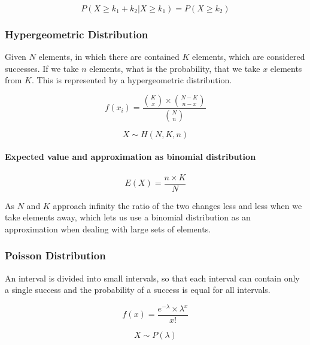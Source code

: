 \documentclass[12pt]{article}
\begin{document}
	\begin{equation*}
		P(X\geq k_1+k_2 | X\geq k_1) = P(X\geq k_2)
	\end{equation*}
	
	\subsubsection{Hypergeometric Distribution}
	
	Given \(N\) elements, in which there are contained \(K\) elements, which are considered successes. If we take \(n\) elements, what is the probability, that we take \(x\) elements from \(K\).
	This is represented by a hypergeometric distribution.
	
	\begin{equation*}
		f(x_i)=\frac{\binom{K}{x}\times \binom{N-K}{n-x}}{\binom{N}{n}}
	\end{equation*}
	
	\begin{equation*}
		X\sim H(N, K, n)
	\end{equation*}
	
	\paragraph{Expected value and approximation as binomial distribution}
	
	\begin{equation*}
		E(X)=\frac{n\times K}{N}
	\end{equation*}
	
	\noindent As \(N\) and \(K\) approach infinity the ratio of the two changes less and less when we take elements away, which lets us use a binomial distribution as an approximation when dealing with large sets of elements.
	
	\subsubsection{Poisson Distribution}
	
	An interval is divided into small intervals, so that each interval can contain only a single success and the probability of a success is equal for all intervals.
	
	\begin{equation*}
		f(x)=\frac{e^{-\lambda}\times \lambda ^x}{x!}
	\end{equation*}
	
	\begin{equation*}
		X\sim P(\lambda)
	\end{equation*}
	
\end{document}
